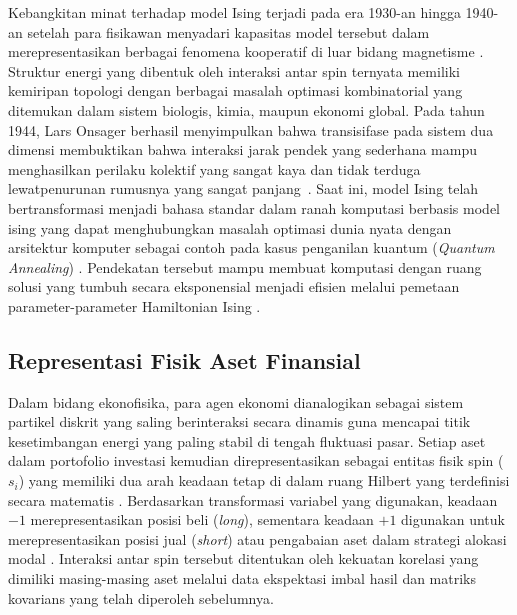 Kebangkitan minat terhadap model Ising terjadi pada era 1930-an hingga 1940-an setelah para fisikawan menyadari kapasitas model tersebut dalam merepresentasikan berbagai fenomena kooperatif di luar bidang magnetisme \cite{niss_history_2005}. Struktur energi yang dibentuk oleh interaksi antar spin ternyata memiliki kemiripan topologi dengan berbagai masalah optimasi kombinatorial yang ditemukan dalam sistem biologis, kimia, maupun ekonomi global. Pada tahun 1944, Lars Onsager berhasil menyimpulkan bahwa transisifase pada sistem dua dimensi membuktikan bahwa interaksi jarak pendek yang sederhana mampu menghasilkan perilaku kolektif yang sangat kaya dan tidak terduga lewatpenurunan rumusnya yang sangat panjang~\cite{kabelac_one-_2021}. Saat ini, model Ising telah bertransformasi menjadi bahasa standar dalam ranah komputasi berbasis model ising yang dapat menghubungkan masalah optimasi dunia nyata dengan arsitektur komputer sebagai contoh pada kasus penganilan kuantum (\textit{Quantum Annealing}) \cite{lucas_ising_2014}. Pendekatan tersebut mampu membuat komputasi dengan ruang solusi yang tumbuh secara eksponensial menjadi efisien melalui pemetaan parameter-parameter Hamiltonian Ising \cite{navarrete_quantum_2022}. 

\subsection{Representasi Fisik Aset Finansial}
Dalam bidang ekonofisika, para agen ekonomi dianalogikan sebagai sistem partikel diskrit yang saling berinteraksi secara dinamis guna mencapai titik kesetimbangan energi yang paling stabil di tengah fluktuasi pasar. Setiap aset dalam portofolio investasi kemudian direpresentasikan sebagai entitas fisik spin ($s_i$) yang memiliki dua arah keadaan tetap di dalam ruang Hilbert yang terdefinisi secara matematis \cite{galam_ising_2010}. Berdasarkan transformasi variabel yang digunakan, keadaan $-1$ merepresentasikan posisi beli (\textit{long}), sementara keadaan $+1$ digunakan untuk merepresentasikan posisi jual (\textit{short}) atau pengabaian aset dalam strategi alokasi modal \cite{lucas_ising_2014}. Interaksi antar spin tersebut ditentukan oleh kekuatan korelasi yang dimiliki masing-masing aset melalui data ekspektasi imbal hasil dan matriks kovarians yang telah diperoleh sebelumnya.

